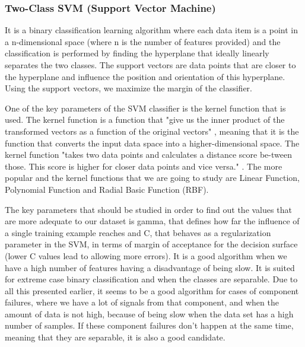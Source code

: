 \subsubsection{Two-Class SVM (Support Vector Machine)}
It is a binary classification learning algorithm where each data item is a point in a n-dimensional space (where n is the number of features provided) and the classification is performed by finding the hyperplane that ideally linearly separates the two classes. The support vectors are data points that are closer to the hyperplane and influence the position and orientation of this hyperplane. Using the support vectors, we maximize the margin of the classifier. \cite{SVM}

One of the key parameters of the SVM classifier is the kernel function that is used. The kernel function is a function that "give us the inner product of the transformed vectors as a function of the original vectors" \cite{FCT_AA}, meaning that it is the function that converts the input data space into a higher-dimensional space. The kernel function "takes two data points and calculates a distance score be-tween those. This score is higher for closer data points and vice versa." \cite{SVM}. The more popular and the kernel functions that we are going to study are Linear Function, Polynomial Function and Radial Basic Function (RBF).

The key parameters that should be studied in order to find out the values that are more adequate to our dataset is gamma, that defines how far the influence of a single training example reaches and C, that behaves as a regularization parameter in the SVM, in terms of margin of acceptance for the decision surface (lower C values lead to allowing more errors).
It is a good algorithm when we have a high number of features having a disadvantage of being slow. It is suited for extreme case binary classification and when the classes are separable.
Due to all this presented earlier, it seems to be a good algorithm for cases of component failures, where we have a lot of signals from that component, and when the amount of data is not high, because of being slow when the data set has a high number of samples. If these component failures don't happen at the same time, meaning that they are separable, it is also a good candidate.

